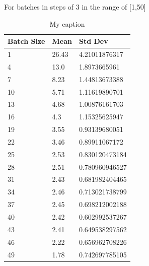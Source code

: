 \documentclass{article}
\begin{document}
For batches in steps of 3 in the range of [1,50]
\begin{table}[H]
\centering
\caption{My caption}
\label{t:bspi_batches}
\begin{tabular}{|l|l|l|}
\hline
Batch Size & Mean  & Std Dev        \\ \hline
1          & 26.43 & 4.21011876317  \\ \hline
4          & 13.0  & 1.8973665961   \\ \hline
7          & 8.23  & 1.44813673388  \\ \hline
10         & 5.71  & 1.11619890701  \\ \hline
13         & 4.68  & 1.00876161703  \\ \hline
16         & 4.3   & 1.15325625947  \\ \hline
19         & 3.55  & 0.93139680051  \\ \hline
22         & 3.46  & 0.89911067172  \\ \hline
25         & 2.53  & 0.830120473184 \\ \hline
28         & 2.51  & 0.780960946527 \\ \hline
31         & 2.43  & 0.681982404465 \\ \hline
34         & 2.46  & 0.713021738799 \\ \hline
37         & 2.45  & 0.698212002188 \\ \hline
40         & 2.42  & 0.602992537267 \\ \hline
43         & 2.41  & 0.649538297562 \\ \hline
46         & 2.22  & 0.656962708226 \\ \hline
49         & 1.78  & 0.742697785105 \\ \hline
\end{tabular}
\end{table}
\end{document}
